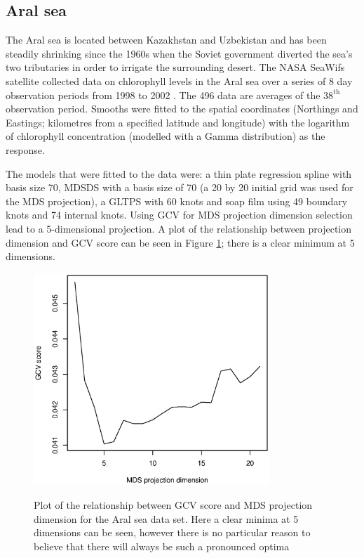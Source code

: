 \documentclass[smallextended]{svjour3}       %
\begin{document}
\subsection{Aral sea}

The Aral sea is located between Kazakhstan and Uzbekistan and has been steadily shrinking since the 1960s when the Soviet government diverted the sea's two tributaries in order to irrigate the surrounding desert. The NASA SeaWifs satellite collected data on chlorophyll levels in the Aral sea over a series of 8 day observation periods from 1998 to 2002 \citep{Wood:2008vo}. The 496 data are averages of the $38^\text{th}$ observation period. Smooths were fitted to the spatial coordinates (Northings and Eastings; kilometres from a specified latitude and longitude) with the logarithm of chlorophyll concentration (modelled with a Gamma distribution) as the response.

The models that were fitted to the data were: a thin plate regression spline with basis size 70, MDSDS with a basis size of 70 (a 20 by 20 initial grid was used for the MDS projection), a GLTPS with 60 knots and soap film using 49 boundary knots and 74 internal knots. Using GCV for MDS projection dimension selection lead to a 5-dimensional projection. A plot of the relationship between projection dimension and GCV score can be seen in Figure \ref{aral-gcvplot}; there is a clear minimum at 5 dimensions.

\begin{figure}
\centering
\includegraphics[width=3.5in]{Fig6.eps} \\
\caption{Plot of the relationship between GCV score and MDS projection dimension for the Aral sea data set. Here a clear minima at 5 dimensions can be seen, however there is no particular reason to believe that there will always be such a pronounced optima}
\label{aral-gcvplot}
\end{figure}
\end{document}
